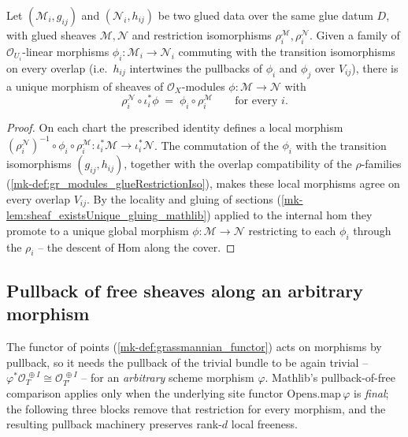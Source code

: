 \begin{definition}
  \label{mk-def:gr_modules_glueHom}
  \lean{}

  Let \((\mathcal{M}_i, g_{ij})\) and \((\mathcal{N}_i, h_{ij})\) be two glued data
  over the same glue datum \(D\), with glued sheaves \(\mathcal{M}, \mathcal{N}\) and
  restriction isomorphisms \(\rho^{\mathcal{M}}_i, \rho^{\mathcal{N}}_i\). Given a family
  of \(\mathcal{O}_{U_i}\)-linear morphisms \(\phi_i : \mathcal{M}_i \to \mathcal{N}_i\)
  commuting with the transition isomorphisms on every overlap (i.e.\ \(h_{ij}\) intertwines
  the pullbacks of \(\phi_i\) and \(\phi_j\) over \(V_{ij}\)), there is a unique morphism
  of sheaves of \(\mathcal{O}_X\)-modules \(\phi : \mathcal{M} \to \mathcal{N}\) with
  \[
    \rho^{\mathcal{N}}_i \circ \iota_i^{*}\phi \;=\; \phi_i \circ \rho^{\mathcal{M}}_i
    \qquad \text{for every } i.
  \]
\end{definition}
\begin{proof}
  On each chart the prescribed identity defines a local morphism
  \((\rho^{\mathcal{N}}_i)^{-1} \circ \phi_i \circ \rho^{\mathcal{M}}_i :
  \iota_i^{*}\mathcal{M} \to \iota_i^{*}\mathcal{N}\). The commutation of the \(\phi_i\)
  with the transition isomorphisms \((g_{ij}, h_{ij})\), together with the overlap
  compatibility of the \(\rho\)-families (\ref{mk-def:gr_modules_glueRestrictionIso}), makes
  these local morphisms agree on every overlap \(V_{ij}\). By the locality and gluing of
  sections (\ref{mk-lem:sheaf_existsUnique_gluing_mathlib}) applied to the internal hom they
  promote to a unique global morphism \(\phi : \mathcal{M} \to \mathcal{N}\) restricting
  to each \(\phi_i\) through the \(\rho_i\) -- the descent of \(\mathrm{Hom}\) along the
  cover.
\end{proof}

\subsection{Pullback of free sheaves along an arbitrary morphism}
\label{mk-sec:grquot_pullback_free}

The functor of points (\ref{mk-def:grassmannian_functor}) acts on morphisms by pullback, so
it needs the pullback of the trivial bundle to be again trivial --
\(\varphi^{*}\mathcal{O}_T^{\,\oplus I} \cong \mathcal{O}_{T'}^{\,\oplus I}\) -- for an
\emph{arbitrary} scheme morphism \(\varphi\). Mathlib's pullback-of-free comparison applies
only when the underlying site functor \(\mathrm{Opens.map}\,\varphi\) is \emph{final}; the
following three blocks remove that restriction for every morphism, and the resulting
pullback machinery preserves rank-\(d\) local freeness.

